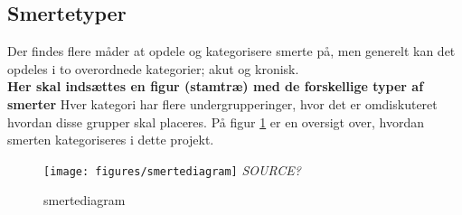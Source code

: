 
\subsection{Smertetyper}


Der findes flere måder at opdele og kategorisere smerte på, men generelt kan det opdeles i to overordnede kategorier; akut og kronisk. \\
\textbf{Her skal indsættes en figur (stamtræ) med de forskellige typer af smerter} 
Hver kategori har flere undergrupperinger, hvor det er omdiskuteret hvordan disse grupper skal placeres. \citep{Giangragorio1997} På figur \ref{smertediagram} er en oversigt over, hvordan smerten kategoriseres i dette projekt.

\begin{figure}[H]
	\caption{smertediagram}
	\label{smertediagram}
	\centering
	\texttt{[image: figures/smertediagram]}
	\flushleft
	\textit{SOURCE?}
\end{figure}

